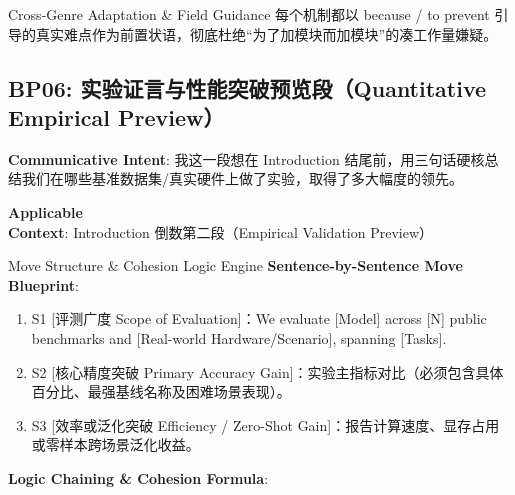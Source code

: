 \endgroup
\vspace{4pt}
\begin{TipBox}{Cross-Genre Adaptation \& Field Guidance}
每个机制都以 because / to prevent 引导的真实难点作为前置状语，彻底杜绝“为了加模块而加模块”的凑工作量嫌疑。
\end{TipBox}
\vspace{8pt}
\subsection{BP06: 实验证言与性能突破预览段（Quantitative Empirical Preview）}\label{sec:bp:BP06}
\noindent\textbf{\color{AcadNavy}Communicative Intent}: 我这一段想在 Introduction 结尾前，用三句话硬核总结我们在哪些基准数据集/真实硬件上做了实验，取得了多大幅度的领先。\par\vspace{2pt}
\noindent\textbf{\color{AcadSlate}Applicable Context}: Introduction 倒数第二段（Empirical Validation Preview）\par\vspace{4pt}
\begin{ConceptBox}{Move Structure \& Cohesion Logic Engine}
\textbf{Sentence-by-Sentence Move Blueprint}:
\begin{enumerate}[label=\textbf{\color{AcadNavy}S\arabic*.}, leftmargin=2em, itemsep=2pt]
  \item S1 [评测广度 Scope of Evaluation]：We evaluate [Model] across [N] public benchmarks and [Real-world Hardware/Scenario], spanning [Tasks].
  \item S2 [核心精度突破 Primary Accuracy Gain]：实验主指标对比（必须包含具体百分比、最强基线名称及困难场景表现）。
  \item S3 [效率或泛化突破 Efficiency / Zero-Shot Gain]：报告计算速度、显存占用或零样本跨场景泛化收益。
\end{enumerate}\par\vspace{4pt}
\textbf{Logic Chaining \& Cohesion Formula}:\par{}
\end{ConceptBox}
